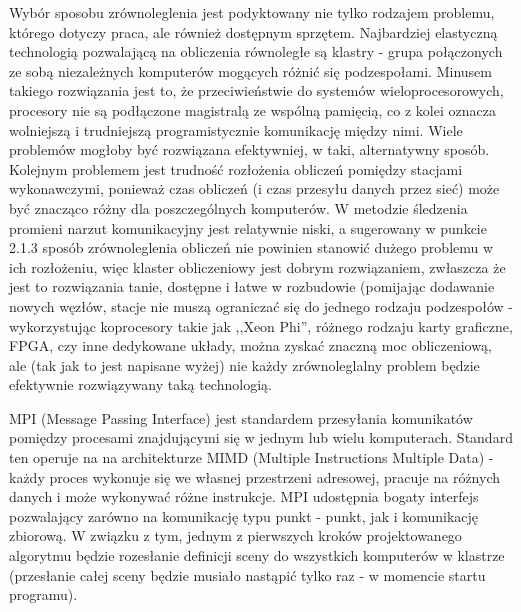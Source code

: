 Wybór sposobu zrównoleglenia jest podyktowany nie tylko rodzajem problemu, którego dotyczy praca, ale również dostępnym sprzętem. Najbardziej elastyczną technologią pozwalającą na obliczenia równoległe są klastry - grupa połączonych ze sobą niezależnych komputerów mogących różnić się podzespołami. Minusem takiego rozwiązania jest to, że przeciwieństwie do systemów wieloprocesorowych, procesory nie są podłączone magistralą ze wspólną pamięcią, co z kolei oznacza wolniejszą i trudniejszą programistycznie komunikację między nimi. Wiele problemów mogłoby być rozwiązana efektywniej, w taki, alternatywny sposób. Kolejnym problemem jest trudność rozłożenia obliczeń pomiędzy stacjami wykonawczymi, ponieważ czas obliczeń (i czas przesyłu danych przez sieć) może być znacząco różny dla poszczególnych komputerów. W metodzie śledzenia promieni narzut komunikacyjny jest relatywnie niski, a sugerowany w punkcie 2.1.3 sposób zrównoleglenia obliczeń nie powinien stanowić dużego problemu w ich rozłożeniu, więc klaster obliczeniowy jest dobrym rozwiązaniem, zwłaszcza że jest to rozwiązania tanie, dostępne i łatwe w rozbudowie (pomijając dodawanie nowych węzłów, stacje nie muszą ograniczać się do jednego rodzaju podzespołów - wykorzystując koprocesory takie jak ,,Xeon Phi'', różnego rodzaju karty graficzne, FPGA, czy inne dedykowane układy, można zyskać znaczną moc obliczeniową, ale (tak jak to jest napisane wyżej) nie każdy zrównoleglalny problem będzie efektywnie rozwiązywany taką technologią. 

MPI (Message Passing Interface) jest standardem przesyłania komunikatów pomiędzy procesami znajdującymi się w jednym lub wielu komputerach. Standard ten operuje na na architekturze MIMD (Multiple Instructions Multiple Data) - każdy proces wykonuje się we własnej przestrzeni adresowej, pracuje na różnych danych i może wykonywać różne instrukcje. MPI udostępnia bogaty interfejs pozwalający zarówno na komunikację typu punkt - punkt, jak i komunikację zbiorową.  W związku z tym, jednym z pierwszych kroków projektowanego algorytmu będzie rozesłanie definicji sceny do wszystkich komputerów w klastrze (przesłanie całej sceny będzie musiało nastąpić tylko raz - w momencie startu programu).